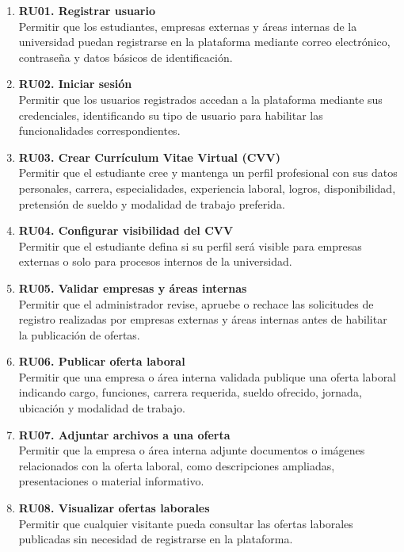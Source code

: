 \documentclass[11pt,a4paper]{Plantilla}
\begin{document}
\begin{enumerate}
    \item \textbf{RU01. Registrar usuario} \\
    Permitir que los estudiantes, empresas externas y áreas internas de la universidad puedan registrarse en la plataforma mediante correo electrónico, contraseña y datos básicos de identificación.

    \item \textbf{RU02. Iniciar sesión} \\
    Permitir que los usuarios registrados accedan a la plataforma mediante sus credenciales, identificando su tipo de usuario para habilitar las funcionalidades correspondientes.

    \item \textbf{RU03. Crear Currículum Vitae Virtual (CVV)} \\
    Permitir que el estudiante cree y mantenga un perfil profesional con sus datos personales, carrera, especialidades, experiencia laboral, logros, disponibilidad, pretensión de sueldo y modalidad de trabajo preferida.

    \item \textbf{RU04. Configurar visibilidad del CVV} \\
    Permitir que el estudiante defina si su perfil será visible para empresas externas o solo para procesos internos de la universidad.

    \item \textbf{RU05. Validar empresas y áreas internas} \\
    Permitir que el administrador revise, apruebe o rechace las solicitudes de registro realizadas por empresas externas y áreas internas antes de habilitar la publicación de ofertas.

    \item \textbf{RU06. Publicar oferta laboral} \\
    Permitir que una empresa o área interna validada publique una oferta laboral indicando cargo, funciones, carrera requerida, sueldo ofrecido, jornada, ubicación y modalidad de trabajo.

    \item \textbf{RU07. Adjuntar archivos a una oferta} \\
    Permitir que la empresa o área interna adjunte documentos o imágenes relacionados con la oferta laboral, como descripciones ampliadas, presentaciones o material informativo.

    \item \textbf{RU08. Visualizar ofertas laborales} \\
    Permitir que cualquier visitante pueda consultar las ofertas laborales publicadas sin necesidad de registrarse en la plataforma.


\end{enumerate}
\end{document}

